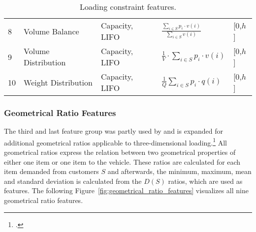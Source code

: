 \begin{table}[!ht]
\begin{tabular}{@{}P{0.08\textwidth}P{0.16\textwidth}P{0.26\textwidth}P{0.28\textwidth}@{}P{0.1\textwidth}@{}}
        8  & Volume Balance                                                                                   & Capacity, \gls{LIFO}   & $\frac{\displaystyle\sum\nolimits_{i \in S}p_i \cdot v(i)}{\displaystyle\sum\nolimits_{i \in S}v(i)}$ & [0,$h$] \\
        9  & Volume Distribution                                                                              & Capacity, \gls{LIFO}   & $\displaystyle\frac{1}{V}\cdot\sum_{i \in S}p_i \cdot v(i)$                                           & [0,$h$] \\
        10 & Weight Distribution                                                                              & Capacity, \gls{LIFO}   & $\displaystyle\frac{1}{Q}\sum_{i \in S}p_i \cdot q(i)$                                                & [0,$h$] \\
        \bottomrule
    \end{tabular}
    \caption{Loading constraint features.}
    \label{tab:loading_constraints_features}
\end{table}


\subsubsection{Geometrical Ratio Features}
The third and last feature group
was partly used by \cite{zhang_learning-based_2022} and is expanded for additional geometrical ratios applicable to three-dimensional loading.\footcite[cf.][p. 14]{zhang_learning-based_2022}
All geometrical ratios express the relation between two geometrical properties of either one item or one item to the vehicle. These ratios
are calculated for each item demanded from customers $S$ and afterwards, the minimum, maximum, mean and standard deviation is calculated
from the $D(S)$ ratios, which are used as features. The following Figure~\ref{fig:geometrical_ratio_features} visualizes all nine geometrical ratio features.


